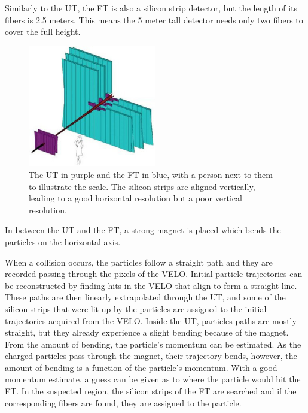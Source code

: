 \documentclass[12pt]{article}
\begin{document}
Similarly to the UT, the FT is also a silicon strip detector, but the length of its fibers is 2.5 meters. This means the 5 meter tall detector needs only two fibers to cover the full height.

\begin{figure}[H]
	\begin{center}
		\includegraphics[width=0.5\textwidth]{detector_ut_ft_drawing}
	\end{center}
	\caption{The UT in purple and the FT in blue, with a person next to them to illustrate the scale. The silicon strips are aligned vertically, leading to a good horizontal resolution but a poor vertical resolution. \cite{tracker_image}}
	\label{fig_detector_ut_ft_drawing}
\end{figure}

In between the UT and the FT, a strong magnet is placed which bends the particles on the horizontal axis.

When a collision occurs, the particles follow a straight path and they are recorded passing through the pixels of the VELO. Initial particle trajectories can be reconstructed by finding hits in the VELO that align to form a straight line. These paths are then linearly extrapolated through the UT, and some of the silicon strips that were lit up by the particles are assigned to the initial trajectories acquired from the VELO. Inside the UT, particles paths are mostly straight, but they already experience a slight bending because of the magnet. From the amount of bending, the particle's momentum can be estimated. As the charged particles pass through the magnet, their trajectory bends, however, the amount of bending is a function of the particle's momentum. With a good momentum estimate, a guess can be given as to where the particle would hit the FT. In the suspected region, the silicon strips of the FT are searched and if the corresponding fibers are found, they are assigned to the particle.
\end{document}
